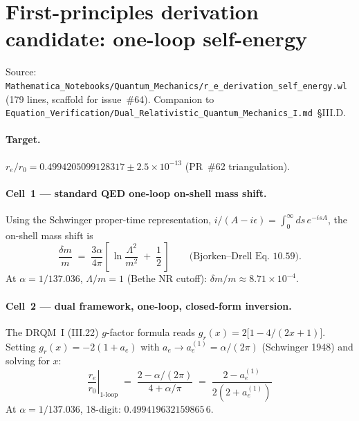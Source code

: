 \section{First-principles derivation candidate: one-loop self-energy}
\label{sec:eq-self-energy}

Source:
\texttt{Mathematica\_Notebooks/Quantum\_Mechanics/r\_e\_derivation\_self\_energy.wl}
(179 lines, scaffold for issue~\#64). Companion to
\texttt{Equation\_Verification/Dual\_Relativistic\_Quantum\_Mechanics\_I.md}~\S III.D.

\paragraph{Target.}
$r_e/r_0 = 0.4994205099128317 \pm 2.5\times 10^{-13}$ (PR~\#62 triangulation).

\paragraph{Cell~1 --- standard QED one-loop on-shell mass shift.}
Using the Schwinger proper-time representation,
$i/(A - i\epsilon) = \int_0^\infty ds\, e^{-isA}$, the on-shell mass shift is
\[
\frac{\delta m}{m} \;=\; \frac{3 \alpha}{4\pi}
   \left[\,\ln\!\frac{\Lambda^2}{m^2} \;+\; \frac{1}{2}\,\right]
\qquad \text{(Bjorken--Drell Eq.~10.59).}
\]
At $\alpha = 1/137.036$, $\Lambda/m = 1$ (Bethe NR cutoff):
$\delta m / m \approx 8.71\times 10^{-4}$.

\paragraph{Cell~2 --- dual framework, one-loop, closed-form inversion.}
The DRQM~I (III.22) $g$-factor formula reads
$g_r(x) = 2\bigl[1 - 4/(2x + 1)\bigr]$.
Setting $g_r(x) = -2(1 + a_e)$ with
$a_e \to a_e^{(1)} = \alpha/(2\pi)$ (Schwinger 1948) and solving for $x$:
\[
\boxed{\;
  \left.\frac{r_e}{r_0}\right|_{1\text{-loop}}
  \;=\; \frac{2 - \alpha/(2\pi)}{4 + \alpha/\pi}
  \;=\; \frac{2 - a_e^{(1)}}{2(2 + a_e^{(1)})}
\;}
\]
At $\alpha = 1/137.036$, 18-digit: $0.499419632159865\,6$.


